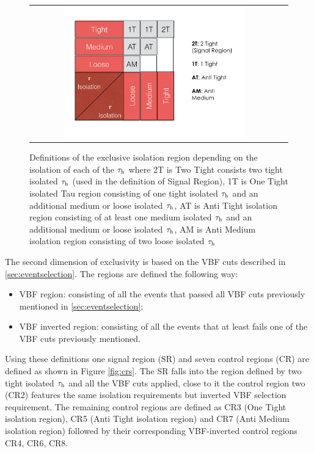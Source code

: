  	\begin{figure}[tbh!]
 		\centering
 		\begin{tabular}{cc}
 			\includegraphics[width=0.75\textwidth]{PLOTS/diTauHadLSotherPlots/tauisoregions.png}
 		\end{tabular}
 		\caption{Definitions of the exclusive isolation region depending on the isolation of each of the $\tau_{\text{h}}$ where 2T is Two Tight consists two tight isolated $\tau_{\text{h}}$ (used in the definition of Signal Region), 1T is One Tight isolated Tau region consisting of one tight isolated $\tau_{\text{h}}$ and an additional medium or loose isolated $\tau_{\text{h}}$, AT is Anti Tight isolation region consisting of at least one medium isolated $\tau_{\text{h}}$ and an additional medium or loose isolated $\tau_{\text{h}}$,  AM is Anti Medium isolation region consisting of two loose isolated $\tau_{\text{h}}$}
 		\label{fig:tauisoregions}
 	\end{figure}
 
The second dimension of exclusivity is based on the VBF cuts described in \ref{sec:eventselection}. The regions are defined the following way:
	
	\begin{itemize}
		\item VBF region: consisting of all the events that passed all VBF cuts previously mentioned in \autoref{sec:eventselection};
		\item VBF inverted region: consisting of all the events that at least fails one of the VBF cuts previously mentioned.
	\end{itemize} 

Using these definitions one signal region (SR) and seven control regions (CR) are defined as shown in Figure \ref{fig:crs}. The SR falls into the region defined by two tight isolated $\tau_{\text{h}}$ and all the VBF cuts applied, close to it the control region two (CR2) features the same \hadtau isolation requirements but inverted VBF selection requirement. The remaining control regions are defined as CR3 (One Tight isolation region), CR5  (Anti Tight isolation region) and CR7 (Anti Medium isolation region) followed by their corresponding VBF-inverted control regions CR4, CR6, CR8.

